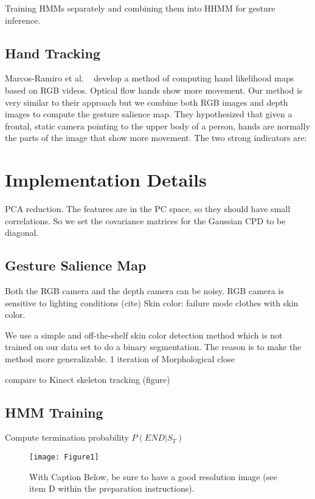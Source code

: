 \documentclass{sigchi}
\begin{document}
Training HMMs separately and combining them into HHMM for gesture inference.

\subsection{Hand Tracking}
Marcos-Ramiro et al. ~\cite{marcos2013} develop a method of computing hand likelihood maps based on RGB videos. Optical flow
hands show more movement. Our method is very similar to their approach but we combine both RGB images and depth images to compute
the gesture salience map. They hypothesized that given a frontal, static camera pointing to the upper body of a person, hands are
normally the parts of the image that show more movement. The two strong indicators are: 

\section{Implementation Details}
PCA reduction. The features are in the PC space, so they should have small correlations.
So we set the covariance matrices for the Gaussian CPD to be diagonal.

\subsection{Gesture Salience Map}
Both the RGB camera and the depth camera can be noisy. RGB camera is sensitive to lighting conditions (cite)
Skin color: failure mode clothes with skin color.

We use a simple and off-the-shelf skin color detection method which is not trained on our data set to do a binary segmentation. The reason is
to make the method more generalizable. 1 iteration of Morphological close

compare to Kinect skeleton tracking (figure)

\subsection{HMM Training}

Compute termination probability $P(END|S_T)$

\begin{figure}[!h]
\centering
\texttt{[image: Figure1]}
\caption{With Caption Below, be sure to have a good resolution image
  (see item D within the preparation instructions).}
\label{fig:figure1}
\end{figure}
\end{document}
